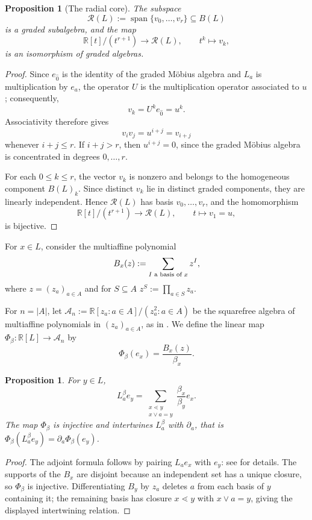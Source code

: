 \documentclass[11pt]{amsart}
\newtheorem{prop}[thm]{Proposition}
\theoremstyle{definition}
\theoremstyle{remark}
\newcommand{\R}{\mathbb{R}}
\newcommand{\cc}{\mathcal}
\DeclareMathOperator{\Span}{span}
\newcommand{\del}{\partial}
\begin{document}
\begin{prop}[The radial core]\label{prop:radial-core}
The subspace
\[
\cc R(L):=\Span\{v_0,\ldots,v_r\}\subseteq B(L)
\]
is a graded subalgebra, and the map
\[
\R[t]/(t^{r+1})\longrightarrow \cc R(L),
\qquad
t^k\longmapsto v_k,
\]
is an isomorphism of graded algebras.
\end{prop}

\begin{proof}
Since $e_{\hat 0}$ is the identity of the graded M\"obius algebra and
$L_a$ is multiplication by $e_a$, the operator $U$
is the multiplication operator associated to $u$; consequently,
\[
v_k=U^ke_{\hat 0}=u^k.
\]
Associativity therefore gives
\[
v_iv_j=u^{i+j}=v_{i+j}
\]
whenever $i+j\le r$.  If $i+j>r$, then $u^{i+j}=0$, since the graded
M\"obius algebra is concentrated in degrees $0,\ldots,r$.

For each $0\le k\le r$, the vector $v_k$ is nonzero and belongs to the
homogeneous component $B(L)_k$.  Since distinct $v_k$ lie in distinct
graded components, they are linearly independent.  Hence
$\cc R(L)$ has basis $v_0,\ldots,v_r$, and the homomorphism
\[
\R[t]/(t^{r+1})\to\cc R(L),\qquad t\mapsto v_1=u,
\]
is bijective. \qedhere
\end{proof}

\medskip

For $x\in L$, consider the multiaffine polynomial
\[
B_x(z) :=\sum_{I\textup{ a basis of }x}z^I,
\]
where $z = (z_a)_{a\in A}$ and for $S\subseteq A$ $z^S := \prod_{a\in S} z_a$.

For $n=|A|$, let $\cc A_n:=\R[z_a:a\in A]/(z_a^2:a\in A)$ be the squarefree algebra of multiaffine polynomials in $(z_a)_{a\in A}$, as in \cite{SinclairFFC}. We define the linear map $\Phi_\beta: \R[L]\to \cc A_n$ by
\[
\Phi_\beta(e_x)=\frac{B_x(z)}{\beta_x}.
\]


\begin{prop}\label{prop:adjoint-polynomial}
For $y\in L$,
\[
L_a^\beta e_y=
\sum_{\substack{x\lessdot y\\x\vee a=y}}
\frac{\beta_x}{\beta_y}e_x.
\]
The map $\Phi_\beta$ is injective and intertwines $L_a^\beta$ with $\del_a$, that is $\Phi_\beta(L_a^\beta e_y) = \del_a\Phi_\beta(e_y)$.
\end{prop}

\begin{proof}
The adjoint formula follows by pairing $L_ae_x$ with $e_y$: see \cite{SinclairHamiltonian} for details.  The supports of the $B_x$ are disjoint because an independent set has a unique closure, so $\Phi_\beta$ is injective.  Differentiating $B_y$ by $z_a$ deletes $a$ from each basis of $y$ containing it; the remaining basis has closure $x\lessdot y$ with $x\vee a=y$, giving the displayed intertwining relation. \qedhere
\end{proof}
\end{document}
